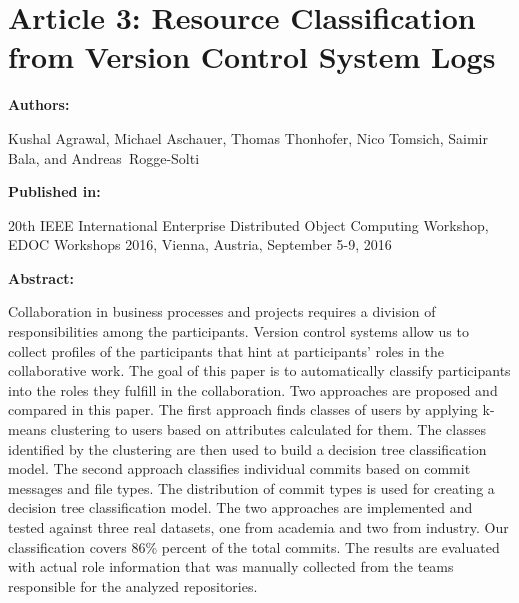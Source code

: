 \chapter{Article 3: Resource Classification from Version Control System Logs}
\label{chap:resource-classfication}

{\bfseries \Large Authors: \medskip}

Kushal Agrawal,
Michael Aschauer,
Thomas Thonhofer,
Nico Tomsich, 
Saimir Bala, and 
Andreas~Rogge-Solti \hfill

\bigskip

{\noindent\bfseries \Large Published in: \medskip}

20th {IEEE} International Enterprise Distributed Object Computing
Workshop, {EDOC} Workshops 2016, Vienna, Austria, September 5-9, 2016

\bigskip

{\noindent\bfseries \Large Abstract: \medskip}


Collaboration in business processes and projects requires a division of responsibilities among the participants. Version control systems allow us to collect profiles of the participants that hint at participants' roles in the collaborative work. The goal of this paper is to automatically classify participants into the roles they fulfill in the collaboration. Two approaches are proposed and compared in this paper. The first approach finds classes of users by applying k-means clustering to users based on attributes calculated for them. The classes identified by the clustering are then used to build a decision tree classification model. The second approach classifies individual commits based on commit messages and file types. The distribution of commit types is used for creating a decision tree classification model. The two approaches are implemented and tested against three real datasets, one from academia and two from industry. Our classification covers 86\% percent of the total commits. The results are evaluated with actual role information that was manually collected from the teams responsible for the analyzed repositories.

\pagebreak









